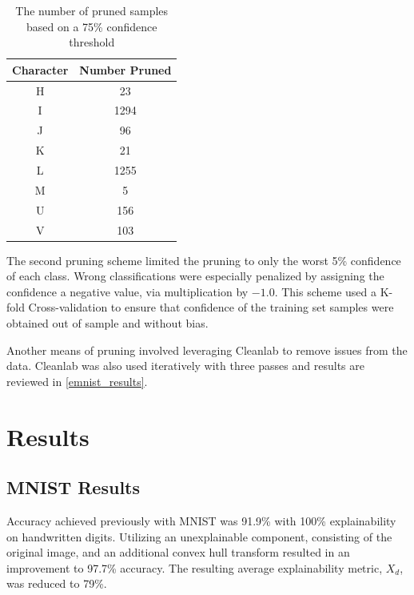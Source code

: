 \documentclass[conference]{IEEEtran}
\begin{document}
\begin{table}
    \centering
    \caption{The number of pruned samples based on a 75\% confidence threshold}
    \begin{tabular}{|c|c|}
        \hline
        Character & Number Pruned \\
        \hline
        \hline
        H & 23 \\
        I & 1294 \\
        J & 96 \\
        K & 21 \\
        L & 1255 \\
        M & 5 \\
        U & 156 \\
        V & 103 \\
        \hline
    \end{tabular}
    \label{tab_threshold_pruning_qty}
\end{table}

The second pruning scheme limited the pruning to only the worst 5\% confidence
of each class. Wrong classifications were especially penalized by assigning the
confidence a negative value, via multiplication by $-1.0$.  This scheme used a
K-fold Cross-validation to ensure that confidence of the training set samples
were obtained out of sample and without bias.

Another means of pruning involved leveraging Cleanlab to remove issues from the data.
Cleanlab was also used iteratively with three passes and results are reviewed in
\ref{emnist_results}.

\section{Results}
\label{results}

\subsection{MNIST Results}
\label{mnist_results}

Accuracy achieved previously with MNIST was 91.9\% with 100\% explainability on
handwritten digits\cite{whitten21}. Utilizing an unexplainable component,
consisting of the original image, and an additional convex hull transform
resulted in an improvement to 97.7\% accuracy.  The resulting average
explainability metric, $X_d$, was reduced to 79\%.

\end{document}
